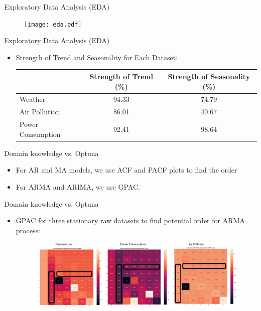 \documentclass[aspectratio=16 9,10pt]{beamer}
\begin{document}
\begin{frame}{Exploratory Data Analysis (EDA)}
\begin{figure}
    \centering
    \texttt{[image: eda.pdf]}   
    \label{fig:eda_plot}
\end{figure}
\end{frame}

\begin{frame}{Exploratory Data Analysis (EDA)}
\begin{itemize}
 \item Strength of Trend and Seasonality for Each Dataset:
\begin{table}
\centering
\begin{tabular}{lcc}
\hline
\textbf{}        & \textbf{Strength of Trend (\%)} & \hspace{0.5cm}\textbf{Strength of Seasonality (\%)} \\ \hline
Weather                 & 94.33                          & 74.79                                 \\ 
Air Pollution           & 86.01                          & 40.67                                 \\ 
Power Consumption       & 92.41                          & 98.64                                 \\ \hline
\end{tabular}
\end{table}
\end{itemize}

\end{frame}

\begin{frame}{Domain knowledge vs. Optuna}
\begin{itemize}
\item For AR and MA models, we use ACF and PACF plots to find the order
\item For ARMA and ARIMA, we use GPAC.
\end{itemize}
\end{frame}



\begin{frame}{Domain knowledge vs. Optuna}
\begin{itemize}
\item GPAC for three stationary raw datasets to find potential order for ARMA process:
\begin{figure}
	\begin{center}
		\includegraphics[scale=0.6]{gpac1.pdf}
	\end{center}
	\label{fig:gpac1}
\end{figure}
\end{itemize}
\end{frame}
\end{document}

